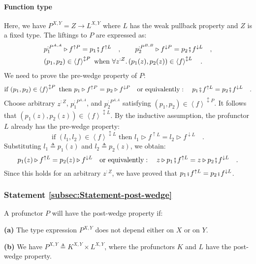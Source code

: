 \paragraph{Function type}

Here, we have $P^{X,Y}=Z\rightarrow L^{X,Y}$ where $L$ has the weak
pullback property and $Z$ is a fixed type. The liftings to $P$ are
expressed as:
\begin{align*}
 & p_{1}^{:P^{A,A}}\triangleright f^{\uparrow P}=p_{1}\bef f^{\uparrow L}\quad,\quad\quad p_{2}^{:P^{B,B}}\triangleright f^{\downarrow P}=p_{2}\bef f^{\downarrow L}\quad,\\
 & (p_{1},p_{2})\in\left<f\right>^{\updownarrow P}\text{ when }\forall z^{:Z}.\,(p_{1}(z),p_{2}(z))\in\left<f\right>^{\updownarrow L}\quad.
\end{align*}
We need to prove the pre-wedge property of $P$:
\[
\text{if }(p_{1},p_{2})\in\left<f\right>^{\updownarrow P}\text{ then }p_{1}\triangleright f^{\uparrow P}=p_{2}\triangleright f^{\downarrow P}\quad\text{or equivalently}:\quad p_{1}\bef f^{\uparrow L}=p_{2}\bef f^{\downarrow L}\quad.
\]
Choose arbitrary $z^{:Z}$, $p_{1}^{:P^{A,A}}$, and $p_{2}^{:P^{A,A}}$
satisfying $(p_{1},p_{2})\in\left<f\right>^{\updownarrow P}$. It
follows that $(p_{1}(z),p_{2}(z))\in\left<f\right>^{\updownarrow L}$.
By the inductive assumption, the profunctor $L$ already has the pre-wedge
property:
\[
\text{if }(l_{1},l_{2})\in\left<f\right>^{\updownarrow L}\text{ then }l_{1}\triangleright f^{\uparrow L}=l_{2}\triangleright f^{\downarrow L}\quad.
\]
Substituting $l_{1}\triangleq p_{1}(z)$ and $l_{2}\triangleq p_{2}(z)$,
we obtain: 
\[
p_{1}(z)\triangleright f^{\uparrow L}=p_{2}(z)\triangleright f^{\downarrow L}\quad\text{or equivalently}:\quad z\triangleright p_{1}\bef f^{\uparrow L}=z\triangleright p_{2}\bef f^{\downarrow L}\quad.
\]
Since this holds for an arbitrary $z^{:Z}$, we have proved that $p_{1}\bef f^{\uparrow L}=p_{2}\bef f^{\downarrow L}$.

\subsubsection{Statement \label{subsec:Statement-post-wedge}\ref{subsec:Statement-post-wedge}}

A profunctor $P$ will have the post-wedge property if:

\textbf{(a)} The type expression $P^{X,Y}$ does not depend either
on $X$ or on $Y$.

\textbf{(b)} We have $P^{X,Y}\triangleq K^{X,Y}\times L^{X,Y}$, where
the profunctors $K$ and $L$ have the post-wedge property.

